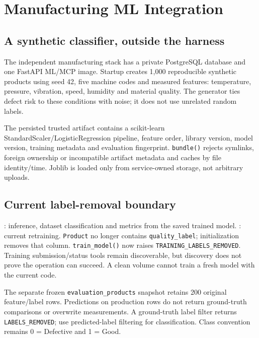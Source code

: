 \chapter{Manufacturing ML Integration}
\section{A synthetic classifier, outside the harness}
The independent manufacturing stack has a private PostgreSQL database and one FastAPI ML/MCP image. Startup creates 1,000 reproducible synthetic products using seed 42, five machine codes and measured features: temperature, pressure, vibration, speed, humidity and material quality. The generator ties defect risk to these conditions with noise; it does not use unrelated random labels.

The persisted trusted artifact contains a scikit-learn StandardScaler/LogisticRegression pipeline, feature order, library version, model version, training metadata and evaluation fingerprint. \texttt{bundle()} rejects symlinks, foreign ownership or incompatible artifact metadata and caches by file identity/time. Joblib is loaded only from service-owned storage, not arbitrary uploads.
\section{Current label-removal boundary}
: inference, dataset classification and metrics from the saved trained model. : current retraining. \texttt{Product} no longer contains \texttt{quality\_label}; initialization removes that column. \texttt{train\_model()} now raises \texttt{TRAINING\_LABELS\_REMOVED}. Training submission/status tools remain discoverable, but discovery does not prove the operation can succeed. A clean volume cannot train a fresh model with the current code.

The separate frozen \texttt{evaluation\_products} snapshot retains 200 original feature/label rows. Predictions on production rows do not return ground-truth comparisons or overwrite measurements. A ground-truth label filter returns \texttt{LABELS\_REMOVED}; use predicted-label filtering for classification. Class convention remains 0 = Defective and 1 = Good.
